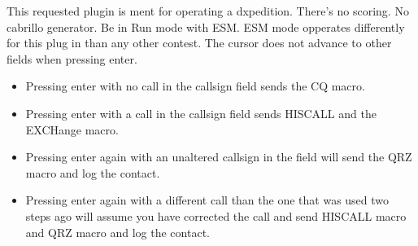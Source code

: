 \documentclass{article}
\begin{document}
This requested plugin is ment for operating a dxpedition. There's no scoring. No cabrillo generator. Be in Run mode with ESM. ESM mode opperates differently for this plug in than any other contest. The cursor does not advance to other fields when pressing enter.

\begin{itemize}
    \item [] Pressing enter with no call in the callsign field sends the CQ macro.
    \item [] Pressing enter with a call in the callsign field sends HISCALL and the EXCHange macro.
    \item [] Pressing enter again with an unaltered callsign in the field will send the QRZ macro and log the contact.
    \item [] Pressing enter again with a different call than the one that was used two steps ago will assume you have corrected the call and send HISCALL macro and QRZ macro and log the contact.
\end{itemize}
\printindex
\end{document}
